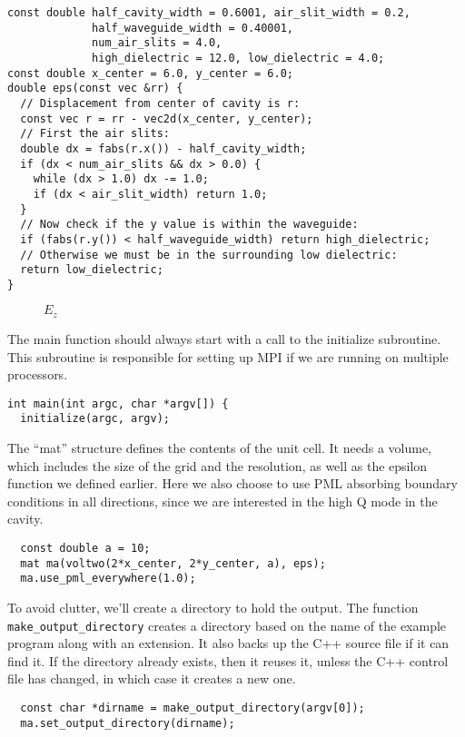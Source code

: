 \begin{verbatim}
const double half_cavity_width = 0.6001, air_slit_width = 0.2,
             half_waveguide_width = 0.40001,
             num_air_slits = 4.0,
             high_dielectric = 12.0, low_dielectric = 4.0;
const double x_center = 6.0, y_center = 6.0;
double eps(const vec &rr) {
  // Displacement from center of cavity is r:
  const vec r = rr - vec2d(x_center, y_center);
  // First the air slits:
  double dx = fabs(r.x()) - half_cavity_width;
  if (dx < num_air_slits && dx > 0.0) {
    while (dx > 1.0) dx -= 1.0;
    if (dx < air_slit_width) return 1.0;
  }
  // Now check if the y value is within the waveguide:
  if (fabs(r.y()) < half_waveguide_width) return high_dielectric;
  // Otherwise we must be in the surrounding low dielectric:
  return low_dielectric;
}
\end{verbatim}
\begin{figure}
\label{simple_figure}
\caption{$E_z$}
\begin{center}
\end{center}
\end{figure}
The main function should always start with a call to the initialize
subroutine.  This subroutine is responsible for setting up MPI if we are
running on multiple processors.
\begin{verbatim}
int main(int argc, char *argv[]) {
  initialize(argc, argv);
\end{verbatim}
The ``mat'' structure defines the contents of the unit cell.  It needs a
volume, which includes the size of the grid and the resolution, as well as
the epsilon function we defined earlier.  Here we also choose to use PML
absorbing boundary conditions in all directions, since we are interested in
the high Q mode in the cavity.
\begin{verbatim}
  const double a = 10;
  mat ma(voltwo(2*x_center, 2*y_center, a), eps);
  ma.use_pml_everywhere(1.0);
\end{verbatim}
To avoid clutter, we'll create a directory to hold the output.  The
function \verb!make_output_directory! creates a directory based on the name
of the example program along with an extension.  It also backs up the C++
source file if it can find it.  If the directory already exists, then it
reuses it, unless the C++ control file has changed, in which case it
creates a new one.
\begin{verbatim}
  const char *dirname = make_output_directory(argv[0]);
  ma.set_output_directory(dirname);
\end{verbatim}
